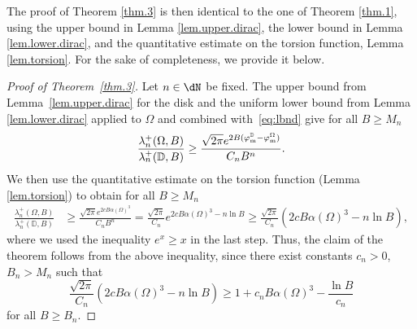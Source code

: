 \documentclass[11pt,a4paper]{amsart}
\newcommand\Omg{\Omega}
\numberwithin{figure}{section}
\numberwithin{equation}{section}
\theoremstyle{plain}%
\theoremstyle{remark}
\theoremstyle{plain}
\newcommand{\D}{\mathbb D}
\begin{document}
The proof of Theorem \ref{thm.3} is then identical to the one of Theorem \ref{thm.1}, using the upper bound in Lemma \ref{lem.upper.dirac}, the lower bound in Lemma \ref{lem.lower.dirac}, and the quantitative estimate on the torsion function, Lemma \ref{lem.torsion}.
For the sake of completeness, we provide it below.
\begin{proof}[Proof of Theorem~\ref{thm.3}]
	Let $n\in\dN$ be fixed.	
	The upper bound from Lemma~\ref{lem.upper.dirac} for the disk and the uniform lower bound from Lemma \ref{lem.lower.dirac} applied to $\Omg$ and combined with~\eqref{eq:lbnd} give for all $B \ge M_n$
	\begin{equation}
		\frac{\lambda_n^+(\Omega,B)}{\lambda_n^+(\D,B)} \geq \frac{\sqrt{2\pi} e^{2B (\varphi_{\rm m} ^\D - \varphi_{\rm m}^\Omega)}}{ C_n B^n}.
	\end{equation}
	We then use the quantitative estimate on the torsion function (Lemma \ref{lem.torsion}) to obtain for all $B  \ge M_n$
	\begin{align*}
		\frac{\lambda_n^+(\Omega,B)}{\lambda_n^+(\D,B)} &\geq \frac{\sqrt{2\pi} e^{2c B \alpha(\Omega)^3}}{ C_n B^n}
	= \frac{\sqrt{2\pi}}{C_n} e^{2cB \alpha(\Omega)^3 - n\ln B} \geq \frac{\sqrt{2\pi}}{ C_n} \left(2 c  B \alpha(\Omega)^3 -  n \ln B\right) ,
	\end{align*}
	where we used the inequality $e^x \ge x$ in the last step.
	Thus, the claim of the theorem follows from the above inequality,
	since there exist constants $c_n>0$, $B_n> M_n$ such that
	\[
	 \frac{\sqrt{2\pi}}{C_n} \left(2 c  B \alpha(\Omega)^3 -  n \ln B\right)  \ge 1 + c_n B \alpha(\Omega)^3 - \frac{\ln B}{c_n} 
	\]
	for all $B \ge B_n$.
\end{proof}
\end{document}
